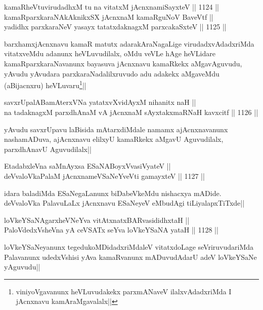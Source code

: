 \begin{shl}
kamaRheVtuvirudadhxM tu na vitatxM jAcnxnamiSayxteV ||  1124 ||  \\
kamaRparxkaraNAkAknikxSX jAcnxnaM kamaRguNoV BaveVtf || \\
yadidhx parxkaraNeV yasayx tatatxdaknagxM parxcakaSxteV ||  1125 || 
\end{shl}

\begin{artha}
barxhamxjAcnxnavu kamaR matutx adarakAraNagaLige virudadxvAdadxriMda vitatxveMdu adanunx heVLuvudilalx, oMdu veVLe hAge heVLidare kamaRparxkaraNavanunx bayasuva jAcnxnavu kamaRkekx aMgavAguvudu, yAvudu yAvudara parxkaraNadalilxruvudo adu adakekx aMgaveMdu (aBijacnxru) heVLuvaru\footnote{viniyoVgavanunx heVLuvudakekx parxmANaveV ilalxvAdadxriMda I jAcnxnavu kamAraMgavalalx||}||
\end{artha}


\begin{shl}
savxrUpalABamAterxVNa yatatxvXvidAyxM nihanitx naH || \\
na tadaknagxM parxdhAnaM vA jAcnxnaM sAyxtakxmaRNaH kavxcitf ||  1126 ||  
\end{shl}

\begin{artha}
yAvudu savxrUpavu laBisida mAtarxdiMdale namamx ajAcnxnavanunx nashamADuva, ajAcnxnavu elilxyU kamaRkekx aMgavU Aguvudilalx, parxdhAnavU Aguvudilalx||
\end{artha}

\begin{shl}
EtadabxleVna saMnAyxsa ESaNABoyxV\s vasiVyateV ||  \\
deVvaloVkaPalaM jAcnxnameVSaNeYveVti gamayxteV ||  1127 ||  
\end{shl}

\begin{artha}
idara baladiMda ESaNegaLanunx biDabeVkeMdu nishacxya mADide. deVvaloVka PalavuLaLx jAcnxnavu ESaNeyeV eMbudAgi tiLiyalapxTiTxde||
\end{artha}

\begin{shl}
loVkeYSaNAgarxheVNeYva vitAtxnatxBARvasididhxtaH || \\
PaloVdedxVsheVna yA ceVSATx seYva loVkeYSaNA yataH ||  1128 ||  
\end{shl}

\begin{artha}
loVkeYSaNeyanunx tegedukoMDidadxriMdaleV vitatxdoLage seVriruvudariMda Palavanunx udedxVshisi yAva kamaRvanunx mADuvudAdarU adeV loVkeYSaNe yAguvudu||
\end{artha}

